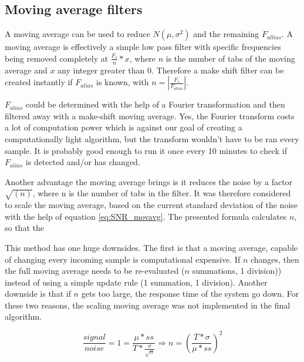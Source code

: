 \subsection{Moving average filters}
A moving average can be used to reduce $N(\mu,\sigma^2)$ and the remaining $F_{allias}$. A moving average is effectively a simple low pass filter with specific frequencies being removed completely at $\frac{F_s}{n}*x$, where $n$ is the number of tabs of the moving average and $x$ any integer greater than 0. Therefore a make shift filter can be created instantly if $F_{alias}$ is known, with $n = \left|\frac{F_{s}}{F_{alias}}\right|$.

$F_{alias}$ could be determined with the help of a Fourier transformation and then filtered away with a make-shift moving average. Yes, the Fourier transform costs a lot of computation power which is against our goal of creating a computationally light algorithm, but the transform wouldn't have to be ran every sample. It is probably good enough to run it once every 10 minutes to check if $F_{alias}$ is detected and/or has changed.

Another advantage the moving average brings is it reduces the noise by a factor $\sqrt{(n)}$, where n is the number of tabs in the filter. It was therefore considered to scale the moving average, based on the current standard deviation of the noise with the help of equation \ref{eq:SNR_movavg}. The presented formula calculates $n$, so that the 

This method has one huge downsides. The first is that a moving average, capable of changing every incoming sample is computational expensive. If $n$ changes, then the full moving average needs to be re-evaluated ($n$ summations, 1 division)) instead of using a simple update rule (1 summation, 1 division). Another downside is that if $n$ gets too large, the response time of the system go down. For these two reasons, the scaling moving average was not implemented in the final algorithm.

\begin{equation}
\label{eq:SNR_movavg}
\frac{signal}{noise} = 1 = \frac{\mu * ss}{T * \frac{\sigma}{\sqrt{n}}} \Rightarrow n = \left(\frac{T * \sigma}{\mu*ss}\right)^2
\end{equation}

